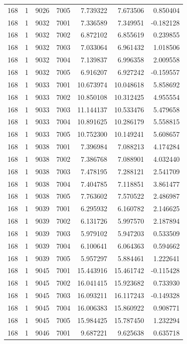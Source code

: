 \begin{table}
\begin{tabular}{rrrrrrr}
168 & 1 & 9026 & 7005 & 7.739322 & 7.673506 & 0.850404 \\
168 & 1 & 9032 & 7001 & 7.336589 & 7.349951 & -0.182128 \\
168 & 1 & 9032 & 7002 & 6.872102 & 6.855619 & 0.239855 \\
168 & 1 & 9032 & 7003 & 7.033064 & 6.961432 & 1.018506 \\
168 & 1 & 9032 & 7004 & 7.139837 & 6.996358 & 2.009558 \\
168 & 1 & 9032 & 7005 & 6.916207 & 6.927242 & -0.159557 \\
168 & 1 & 9033 & 7001 & 10.673974 & 10.048618 & 5.858692 \\
168 & 1 & 9033 & 7002 & 10.850108 & 10.312425 & 4.955554 \\
168 & 1 & 9033 & 7003 & 11.144137 & 10.533476 & 5.479658 \\
168 & 1 & 9033 & 7004 & 10.891625 & 10.286179 & 5.558815 \\
168 & 1 & 9033 & 7005 & 10.752300 & 10.149241 & 5.608657 \\
168 & 1 & 9038 & 7001 & 7.396984 & 7.088213 & 4.174284 \\
168 & 1 & 9038 & 7002 & 7.386768 & 7.088901 & 4.032440 \\
168 & 1 & 9038 & 7003 & 7.478195 & 7.288121 & 2.541709 \\
168 & 1 & 9038 & 7004 & 7.404785 & 7.118851 & 3.861477 \\
168 & 1 & 9038 & 7005 & 7.763602 & 7.570522 & 2.486987 \\
168 & 1 & 9039 & 7001 & 6.295932 & 6.160782 & 2.146625 \\
168 & 1 & 9039 & 7002 & 6.131726 & 5.997570 & 2.187894 \\
168 & 1 & 9039 & 7003 & 5.979102 & 5.947203 & 0.533509 \\
168 & 1 & 9039 & 7004 & 6.100641 & 6.064363 & 0.594662 \\
168 & 1 & 9039 & 7005 & 5.957297 & 5.884461 & 1.222641 \\
168 & 1 & 9045 & 7001 & 15.443916 & 15.461742 & -0.115428 \\
168 & 1 & 9045 & 7002 & 16.041415 & 15.923682 & 0.733930 \\
168 & 1 & 9045 & 7003 & 16.093211 & 16.117243 & -0.149328 \\
168 & 1 & 9045 & 7004 & 16.006383 & 15.860922 & 0.908771 \\
168 & 1 & 9045 & 7005 & 15.984425 & 15.787450 & 1.232294 \\
168 & 1 & 9046 & 7001 & 9.687221 & 9.625638 & 0.635718 \\

\end{tabular}
\end{table}
